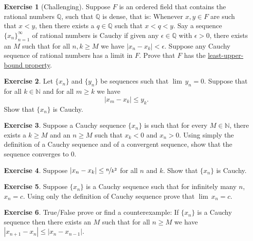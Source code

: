 \documentclass[12pt]{book}
\newcommand{\abs}[1]{\left\lvert {#1} \right\rvert}
\newcommand{\N}{{\mathbb{N}}}
\newcommand{\Q}{{\mathbb{Q}}}
\theoremstyle{plain}
\theoremstyle{remark}
\theoremstyle{definition}
\theoremstyle{exercise}
\newtheorem{exercise}{Exercise}[section]
\theoremstyle{example}
\begin{document}
\begin{exercise}[Challenging]
Suppose $F$ is an ordered field that contains the rational numbers
$\Q$, such that $\Q$ is dense,
that is: Whenever $x,y \in F$ are such that $x < y$,
then there exists a $q \in \Q$ such that $x < q < y$.
Say a sequence $\{ x_n \}_{n=1}^\infty$ of rational numbers is Cauchy
if given any $\epsilon \in \Q$ with $\epsilon > 0$, there exists
an $M$ such that for all $n,k \geq M$ we have $\abs{x_n-x_k} < \epsilon$.
Suppose any Cauchy sequence of rational numbers has a limit in $F$.
Prove that $F$ has the \hyperref[defn:lub]{least-upper-bound property}.
\end{exercise}

\begin{exercise}
Let $\{ x_n \}$ and $\{ y_n \}$ be sequences such
that $\lim\, y_n =0$.  Suppose that for all $k \in \N$
and
for all $m \geq k$ we have
\begin{equation*}
\abs{x_m-x_k} \leq y_k .
\end{equation*}
Show that $\{ x_n \}$ is Cauchy.
\end{exercise}

\begin{exercise}
Suppose a Cauchy sequence $\{ x_n \}$ is such that for every $M \in \N$,
there exists a $k \geq M$ and an $n \geq M$ such that
$x_k < 0$ and $x_n > 0$.  Using simply the definition of a Cauchy sequence
and of a convergent sequence, show that
the sequence converges to $0$.
\end{exercise}

\begin{exercise}
Suppose $\abs{x_n-x_k} \leq \nicefrac{n}{k^2}$ for all $n$ and $k$.
Show that $\{ x_n \}$ is Cauchy.
\end{exercise}

\begin{exercise}
Suppose $\{ x_n \}$ is a Cauchy sequence such that for infinitely many
$n$, $x_n = c$.  Using only the definition of Cauchy sequence prove 
that $\lim\, x_n = c$.
\end{exercise}

\begin{exercise}
True/False prove or find a counterexample:  If $\{ x_n \}$ is a Cauchy sequence then there exists an $M$
such that for all $n \geq M$ we have
$\abs{x_{n+1}-x_n}
\leq
\abs{x_{n}-x_{n-1}}$.
\end{exercise}


\end{document}
